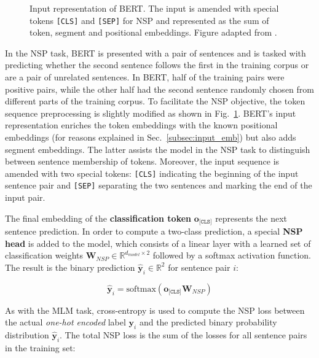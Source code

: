 \begin{figure}[htb]
    \centering
    
    \caption[Input representation of BERT]{Input representation of BERT. The
    input is amended with special tokens \texttt{[CLS]} and \texttt{[SEP]} for
    NSP and represented as the sum of token, segment and positional embeddings.
    Figure adapted from \cite{devlin2019bert}.}
    \label{fig:bert_input}
\end{figure}

In the NSP task, BERT is presented with a pair of sentences and is tasked with
predicting whether the second sentence follows the first in the training corpus
or are a pair of unrelated sentences. In BERT, half of the training pairs were
positive pairs, while the other half had the second sentence randomly chosen
from different parts of the training corpus. To facilitate the NSP objective,
the token sequence preprocessing is slightly modified as shown in
Fig.~\ref{fig:bert_input}. BERT's input representation enriches the token
embeddings with the known positional embeddings (for reasons explained in
Sec.~\ref{subsec:input_emb}) but also adds segment embeddings. The latter
assists the model in the NSP task to distinguish between sentence membership of
tokens. Moreover, the input sequence is amended with two special tokens:
\texttt{[CLS]} indicating the beginning of the input sentence pair and
\texttt{[SEP]} separating the two sentences and marking the end of the input
pair. 

The final embedding of the \textbf{classification token}
$\bm{o}_{\texttt{[CLS]}}$ represents the next sentence prediction. In order to
compute a two-class prediction, a special \textbf{NSP head} is added to the
model, which consists of a linear layer with a learned set of classification
weights $\bm{W}_{NSP} \in \mathbb{R}^{d_{model} \times 2}$ followed by a softmax
activation function. The result is the binary prediction $\bm{\hat{y}}_i \in
\mathbb{R}^2$ for sentence pair $i$:

\begin{equation}
    \bm{\hat{y}}_i = \text{softmax}(\bm{o}_{\texttt{[CLS]}} \bm{W}_{NSP})
\end{equation}

As with the MLM task, cross-entropy is used to compute the NSP loss between the
actual \textit{one-hot encoded} label $\bm{y}_i$ and the predicted binary
probability distribution $\bm{\hat{y}}_i$. The total NSP loss is the sum of the
losses for all sentence pairs in the training set:

